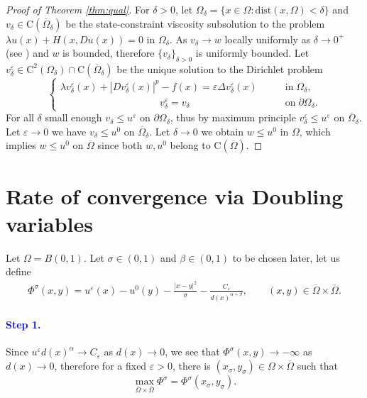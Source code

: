 \documentclass[11pt,reqno]{amsart}
\numberwithin{figure}{section}
\theoremstyle{plain}
\theoremstyle{remark}
\numberwithin{equation}{section}
\newcommand{\rmC}{\mathrm{C}}
\begin{document}
\begin{proof}[Proof of Theorem \ref{thm:qual}]
For $\delta>0$, let $\Omega_\delta = \{x\in \Omega: \mathrm{dist}(x,\Omega) < \delta\}$ and $v_\delta\in\rmC(\overline{\Omega}_\delta)$ be the state-constraint viscosity subsolution to the problem $\lambda u(x) + H(x,Du(x)) = 0$ in $\Omega_\delta$. As $v_\delta\rightarrow w$ locally uniformly as $\delta\rightarrow 0^+$ (see \cite{kim_state-constraint_2020}) and $w$ is bounded, therefore $\{v_\delta\}_{\delta>0}$ is uniformly bounded. Let $v^\varepsilon_\delta\in \rmC^2(\Omega_\delta)\cap \rmC(\overline{\Omega}_\delta)$ be the unique solution to the Dirichlet problem
\begin{equation}\label{eq:vv_eps}
\begin{cases}
    \lambda v_\delta^\varepsilon(x) + |Dv_\delta^\varepsilon(x)|^p - f(x) = \varepsilon \Delta v_\delta^\varepsilon(x) &\qquad\text{in}\;\Omega_\delta,\\
    \;\;\;\,\quad\qquad\qquad\qquad\qquad v_\delta^\varepsilon = v_\delta &\qquad \text{on}\;\partial\Omega_\delta.
\end{cases}
\end{equation}
For all $\delta$ small enough $v_\delta\leq u^\varepsilon$ on $\partial \Omega_\delta$, thus by maximum principle $v^\varepsilon_\delta \leq u^\varepsilon$ on $\overline{\Omega}_\delta$. Let $\varepsilon\to 0$ we have $v_\delta \leq u^0$ on $\overline{\Omega}_\delta$.
Let $\delta\rightarrow 0$ we obtain $w\leq u^0$ in $\Omega$, which implies $w\leq u^0$ on $\overline{\Omega}$ since both $w,u^0$ belong to $\rmC(\overline{\Omega})$.
\end{proof}

\section{Rate of convergence via Doubling variables}
\noindent Let $\Omega = B(0,1)$. Let $\sigma \in (0,1)$ and $\beta \in (0,1)$ to be chosen later, let us define
\begin{align*}
    \Phi^{\sigma}(x,y) =  u^\varepsilon(x) - u^0(y) - \frac{|x-y|^2}{\sigma}- \frac{C_\varepsilon}{d(x)^{\alpha+\beta}}, \qquad (x,y)\in \overline{\Omega}\times\overline{\Omega}.
\end{align*}
\paragraph{\textcolor{blue}{\textbf{Step 1.}}} Since $u^\varepsilon d(x)^\alpha \to C_\varepsilon$ as $d(x)\to 0$, we see that $\Phi^\sigma(x,y)\to -\infty$ as $d(x)\to 0$, therefore for a fixed $\varepsilon>0$, there is $(x_{\sigma},y_\sigma)\in \Omega\times\overline{\Omega}$ such that 
\begin{equation*}
    \max_{\overline{\Omega}\times \overline{\Omega}} \Phi^\sigma = \Phi^\sigma(x_\sigma,y_\sigma).
\end{equation*}
\end{document}
